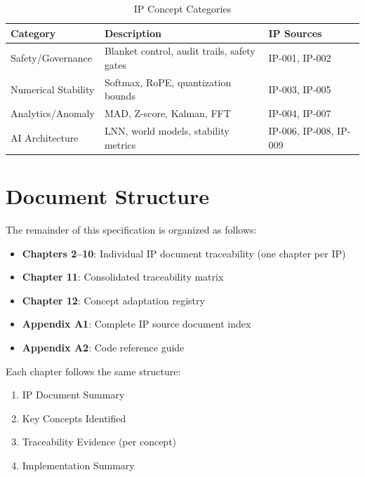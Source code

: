 \begin{table}[H]
\centering
\caption{IP Concept Categories}
\label{tab:concept-categories}
\begin{tabularx}{\textwidth}{@{}lXl@{}}
\toprule
\textbf{Category} & \textbf{Description} & \textbf{IP Sources} \\
\midrule
Safety/Governance & Blanket control, audit trails, safety gates & IP-001, IP-002 \\
Numerical Stability & Softmax, RoPE, quantization bounds & IP-003, IP-005 \\
Analytics/Anomaly & MAD, Z-score, Kalman, FFT & IP-004, IP-007 \\
AI Architecture & LNN, world models, stability metrics & IP-006, IP-008, IP-009 \\
\bottomrule
\end{tabularx}
\end{table}

\section{Document Structure}

The remainder of this specification is organized as follows:

\begin{itemize}[nosep]
    \item \textbf{Chapters 2--10}: Individual IP document traceability (one chapter per IP)
    \item \textbf{Chapter 11}: Consolidated traceability matrix
    \item \textbf{Chapter 12}: Concept adaptation registry
    \item \textbf{Appendix A1}: Complete IP source document index
    \item \textbf{Appendix A2}: Code reference guide
\end{itemize}

Each chapter follows the same structure:
\begin{enumerate}[nosep]
    \item IP Document Summary
    \item Key Concepts Identified
    \item Traceability Evidence (per concept)
    \item Implementation Summary
\end{enumerate}